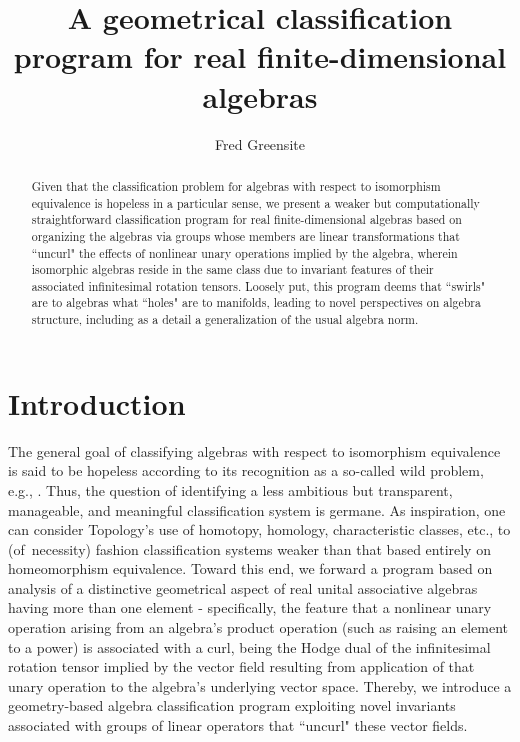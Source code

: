 \documentclass{amsart}
\numberwithin{equation}{section}
\theoremstyle{definition}
\numberwithin{theorem}{section}
\begin{document}
       
             \title{A geometrical classification program for real finite-dimensional algebras}
    \author{Fred Greensite}
    
   \begin{abstract}     Given that the classification problem for algebras with respect to isomorphism equivalence is hopeless in a particular sense, we present a weaker but computationally straightforward classification program for real finite-dimensional algebras based on organizing the algebras via groups whose members are linear transformations that ``uncurl" the effects of nonlinear unary operations implied by the algebra, wherein isomorphic algebras reside in the same class due to invariant features of their associated infinitesimal rotation tensors.   Loosely put, this program deems that ``swirls" are to algebras what ``holes" are to manifolds, leading to novel perspectives on algebra structure, including as a detail a generalization of the usual algebra norm.   
   \end{abstract}
        
  \maketitle
  
 \tableofcontents
 
  \section{Introduction} The general goal of classifying algebras with respect to isomorphism equivalence is said to be hopeless according to its recognition as a so-called wild problem, e.g., \cite{drozd:1972,prest:1991,sergeichuk:2000,belitskii:2005}.   Thus, the question of identifying a less ambitious but transparent, manageable, and meaningful classification system is germane.  As inspiration, one can consider Topology's use of homotopy, homology, characteristic classes, etc., to \mbox{(of necessity)} fashion classification systems weaker than that based entirely on homeomorphism equivalence.  Toward this end, we forward a program based on analysis of a distinctive geometrical aspect of real unital associative algebras having more than one element  - specifically, the feature that a nonlinear unary operation arising from an algebra's product operation (such as raising an element to a power) is associated with a curl, being the Hodge dual of the infinitesimal rotation tensor implied by the vector field resulting from application of that unary operation to the algebra's underlying vector space.   Thereby, we introduce a geometry-based algebra classification program exploiting novel invariants associated with groups of linear operators that ``uncurl" these vector fields.  
     
\end{document}
